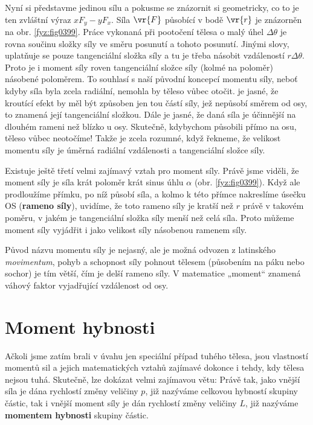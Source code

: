     Nyní si představme jedinou sílu a pokusme se znázornit si geometricky, co to je ten zvláštní
    výraz \( xF_y−yF_x\). Síla \(\vr{F}\) působící v bodě \(\vr{r}\) je znázorněn na obr.
    \ref{fyz:fig0399}. Práce vykonaná při pootočení tělesa o malý úhel \( Δθ\) je rovna součinu
    složky síly ve směru posunutí a tohoto posunutí. Jinými slovy, uplatňuje se pouze tangenciální
    složka síly a tu je třeba násobit vzdáleností \( rΔθ\). Proto je i moment síly roven
    tangenciální složce síly (kolmé na poloměr) násobené poloměrem. To souhlasí s naší původní
    koncepcí momentu síly, neboť kdyby síla byla zcela radiální, nemohla by těleso vůbec otočit. je
    jasné, že kroutící efekt by měl být způsoben jen tou částí síly, jež nepůsobí směrem od osy, to
    znamená její tangenciální složkou. Dále je jasné, že daná síla je účinnější na dlouhém rameni
    než blízko u osy. Skutečně, kdybychom působili přímo na osu, těleso vůbec neotočíme! Takže je
    zcela rozumné, když řekneme, že velikost momentu síly je úměrná radiální vzdálenosti a
    tangenciální složce síly.

    Existuje ještě třetí velmi zajímavý vztah pro moment síly. Právě jsme viděli, že moment síly
    je síla krát poloměr krát sinus úhlu \(\alpha\) (obr. \ref{fyz:fig0399}). Když ale prodloužíme
    přímku, po níž působí síla, a kolmo k této přímce nakreslíme úsečku OS (\textbf{rameno síly}),
    uvidíme, že toto rameno síly je kratší než \(r\) právě v takovém poměru, v jakém je tangenciální
    složka síly menší než celá síla. Proto můžeme moment síly vyjádřit i jako velikost síly
    násobenou ramenem síly.

    Původ názvu momentu síly je nejasný, ale je možná odvozen z latinského \emph{movimentum}, pohyb
    a schopnost síly pohnout tělesem (působením na páku nebo sochor) je tím větší, čím je delší
    rameno síly. V matematice „moment“ znamená váhový faktor vyjadřující vzdálenost od osy.    

  \section{Moment hybnosti}\label{fyz:IchapXVIIIsecIII}
    Ačkoli jsme zatím brali v úvahu jen speciální případ tuhého tělesa, jsou vlastností momentů sil
    a jejich matematických vztahů zajímavé dokonce i tehdy, kdy tělesa nejsou tuhá. Skutečně, lze
    dokázat velmi zajímavou větu: Právě tak, jako vnější síla je dána rychlostí změny veličiny
    \(p\), již nazýváme celkovou hybností skupiny částic, tak i vnější moment síly je dán rychlostí
    změny veličiny \(L\), již nazýváme \textbf{momentem hybnosti} skupiny částic.
  
